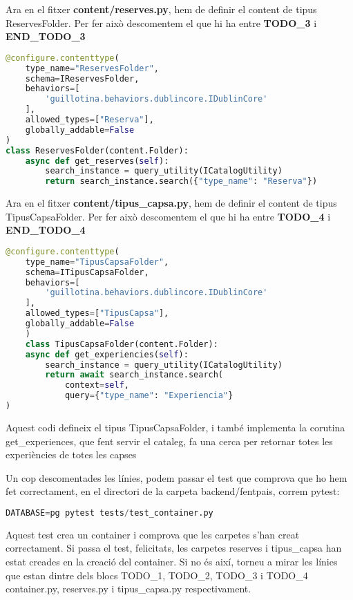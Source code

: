 \documentclass[a4paper, 11pt]{article}
\begin{document}
  Ara en el fitxer \textbf{content/reserves.py}, hem de definir el content de tipus
  ReservesFolder. Per fer això descomentem el que hi ha entre
  \textbf{TODO\_3} i \textbf{END\_TODO\_3}

  \begin{lstlisting}[language=Python, caption=Configuració content ReservesFolder]
  @configure.contenttype(
    type_name="ReservesFolder",
    schema=IReservesFolder,
    behaviors=[
        'guillotina.behaviors.dublincore.IDublinCore'
    ],
    allowed_types=["Reserva"],
    globally_addable=False
)
class ReservesFolder(content.Folder):
    async def get_reserves(self):
        search_instance = query_utility(ICatalogUtility)
        return search_instance.search({"type_name": "Reserva"})
      \end{lstlisting}

  Ara en el fitxer \textbf{content/tipus\_capsa.py}, hem de definir el content de tipus
  TipusCapsaFolder. Per fer això descomentem el que hi ha entre
  \textbf{TODO\_4} i \textbf{END\_TODO\_4}

  \begin{lstlisting}[language=Python, caption=Configuració content ReservesFolder]
    @configure.contenttype(
    type_name="TipusCapsaFolder",
    schema=ITipusCapsaFolder,
    behaviors=[
        'guillotina.behaviors.dublincore.IDublinCore'
    ],
    allowed_types=["TipusCapsa"],
    globally_addable=False
    )
    class TipusCapsaFolder(content.Folder):
    async def get_experiencies(self):
        search_instance = query_utility(ICatalogUtility)
        return await search_instance.search(
            context=self,
            query={"type_name": "Experiencia"}
)
\end{lstlisting}
Aquest codi defineix el tipus TipusCapsaFolder, i també implementa la
corutina get\_experiences, que fent servir el cataleg, fa una cerca per
retornar totes les experiències de totes les capses
  

  Un cop descomentades les línies, podem passar el test que comprova
  que ho hem fet correctament, en el directori de la carpeta
  backend/fentpais, correm pytest:
  \begin{lstlisting}[language=Python, caption=Testing 1]
    DATABASE=pg pytest tests/test_container.py
  \end{lstlisting}
  
  Aquest test crea un container i comprova que les carpetes s'han
  creat correctament. Si passa el test, felicitats, les carpetes
  reserves i tipus\_capsa han estat creades en la creació del
  container. Si no és així, torneu a mirar les línies que estan dintre
  dels blocs TODO\_1, TODO\_2, TODO\_3 i TODO\_4 container.py,
  reserves.py i tipus\_capsa.py respectivament.
\end{document}
